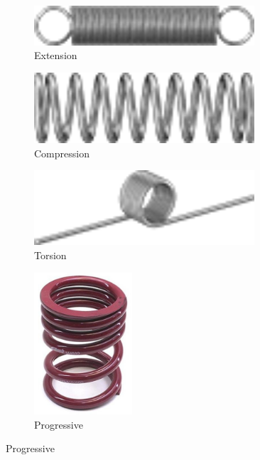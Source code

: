 	\begin{figure}[H]
		\begin{subfigure}[b]{.19\linewidth}
			\includegraphics[width=0.9\textwidth]{imgs/spring_extension.png}
			\caption{Extension}
		\end{subfigure}\begin{subfigure}[b]{.19\linewidth}
			\includegraphics[width=0.9\textwidth]{imgs/spring_compression.png}
			\caption{Compression}
		\end{subfigure}\begin{subfigure}[b]{.19\linewidth}
			\includegraphics[width=0.9\textwidth]{imgs/spring_torsion.png}
			\caption{Torsion}
		\end{subfigure}\begin{subfigure}[b]{.19\linewidth}
			\includegraphics[width=0.4\textwidth, angle=-90]{imgs/spring_progressive.png}
			\caption{Progressive}
		\end{subfigure}
		

\end{figure}
